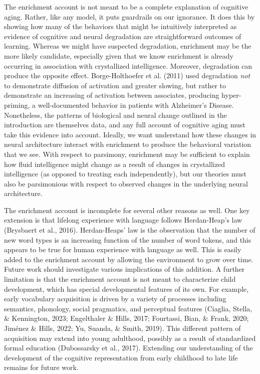 \documentclass[
  man,floatsintext]{apa6}
\begin{document}
The enrichment account is not meant to be a complete explanation of cognitive aging. Rather, like any model, it puts guardrails on our ignorance. It does this by showing how many of the behaviors that might be intuitively interpreted as evidence of cognitive and neural degradation are straightforward outcomes of learning. Whereas we might have suspected degradation, enrichment may be the more likely candidate, especially given that we know enrichment is already occurring in association with crystallized intelligence. Moreover, degradation can produce the opposite effect. Borge-Holthoefer et al. (2011) used degradation \emph{not} to demonstrate diffusion of activation and greater slowing, but rather to demonstrate an increasing of activation between associates, producing hyper-priming, a well-documented behavior in patients with Alzheimer's Disease. Nonetheless, the patterns of biological and neural change outlined in the introduction are themselves data, and any full account of cognitive aging must take this evidence into account. Ideally, we want understand how these changes in neural architecture interact with enrichment to produce the behavioral variation that we see. With respect to parsimony, enrichment may be sufficient to explain how fluid intelligence might change as a result of changes in crystallized intelligence (as opposed to treating each independently), but our theories must also be parsimonious with respect to observed changes in the underlying neural architecture.

The enrichment account is incomplete for several other reasons as well. One key extension is that lifelong experience with language follows Herdan-Heap's law (Brysbaert et al., 2016). Herdan-Heaps' law is the observation that the number of new word types is an increasing function of the number of word tokens, and this appears to be true for human experience with language as well. This is easily added to the enrichment account by allowing the environment to grow over time. Future work should investigate various implications of this addition. A further limitation is that the enrichment account is not meant to characterize child development, which has special developmental features of its own. For example, early vocabulary acquisition is driven by a variety of processes including semantics, phonology, social pragmatics, and perceptual features (Ciaglia, Stella, \& Kennington, 2023; Engelthaler \& Hills, 2017; Fourtassi, Bian, \& Frank, 2020; Jiménez \& Hills, 2022; Yu, Suanda, \& Smith, 2019). This different pattern of acquisition may extend into young adulthood, possibly as a result of standardized formal education (Dubossarsky et al., 2017). Extending our understanding of the development of the cognitive representation from early childhood to late life remains for future work.
\end{document}
